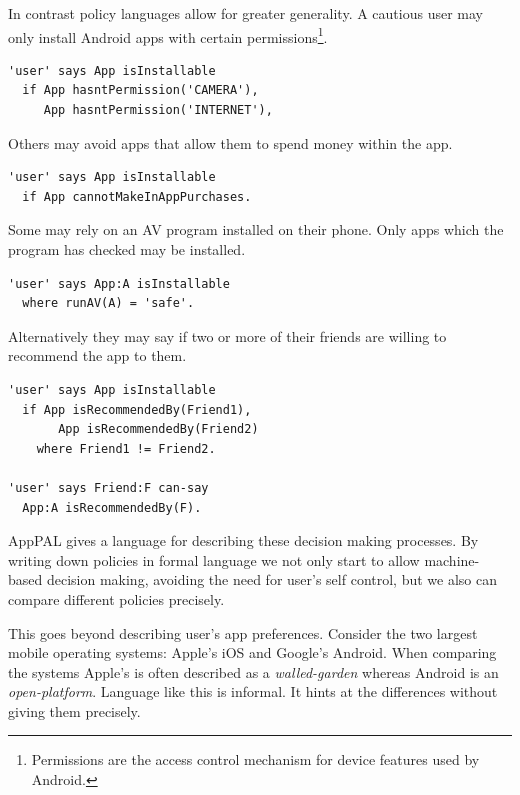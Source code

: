 \documentclass[thesis.tex]{subfiles}
\begin{document}
In contrast policy languages allow for greater generality.
A cautious user may only install Android apps with certain permissions\footnote{Permissions are the access control mechanism for device features used by Android.}.
\begin{lstlisting}
'user' says App isInstallable
  if App hasntPermission('CAMERA'),
     App hasntPermission('INTERNET'),
\end{lstlisting}
Others may avoid apps that allow them to spend money within the app.
\begin{lstlisting}
'user' says App isInstallable
  if App cannotMakeInAppPurchases.
\end{lstlisting}
Some may rely on an \ac{AV} program installed on their phone.
Only apps which the program has checked may be installed.
\begin{lstlisting}
'user' says App:A isInstallable
  where runAV(A) = 'safe'.
\end{lstlisting}
Alternatively they may say if two or more of their friends are willing to recommend the app to them.
\begin{lstlisting}
'user' says App isInstallable
  if App isRecommendedBy(Friend1),
	   App isRecommendedBy(Friend2)
	where Friend1 != Friend2.

'user' says Friend:F can-say
  App:A isRecommendedBy(F).
\end{lstlisting}

AppPAL gives a language for describing these decision making processes.
By writing down policies in formal language we not only start to allow machine-based decision making, avoiding the need for user's self control, but we also can compare different policies precisely.

This goes beyond describing user's app preferences.
Consider the two largest mobile operating systems: Apple's iOS and Google's Android.
When comparing the systems Apple's is often described as a \emph{walled-garden} whereas Android is an \emph{open-platform}.
Language like this is informal.
It hints at the differences without giving them precisely.
\end{document}
